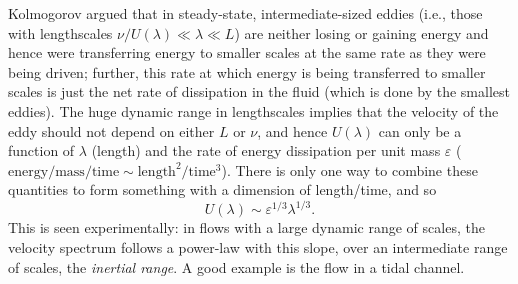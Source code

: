 Kolmogorov argued that in steady-state, intermediate-sized eddies (i.e., those with lengthscales $\nu/U(\lambda) \ll \lambda \ll L$) are neither losing or gaining energy and hence were transferring energy to smaller scales at the same rate as they were being driven; further, this rate at which energy is being transferred to smaller scales is just the net rate of dissipation in the fluid (which is done by the smallest eddies).  The huge dynamic range in lengthscales implies that the velocity of the eddy should not depend on either $L$ or $\nu$, and hence $U(\lambda)$ can only be a function of $\lambda$ (length) and the rate of energy dissipation per unit mass $\varepsilon$ ($\mathrm{energy/mass/time}\sim\mathrm{length^{2}/time^{3}}$). There is only one way to combine these quantities to form something with a dimension of length/time, and so
\begin{equation}\label{e.kolmogorov-velocity}
U(\lambda) \sim \varepsilon^{1/3}\lambda^{1/3}.
\end{equation}
This is seen experimentally: in flows with a large dynamic range of scales, the velocity spectrum follows a power-law with this slope, over an intermediate range of scales, the \emph{inertial range}.  A good example is the flow in a tidal channel\cite{Grant1962Turbulence-spec}.
